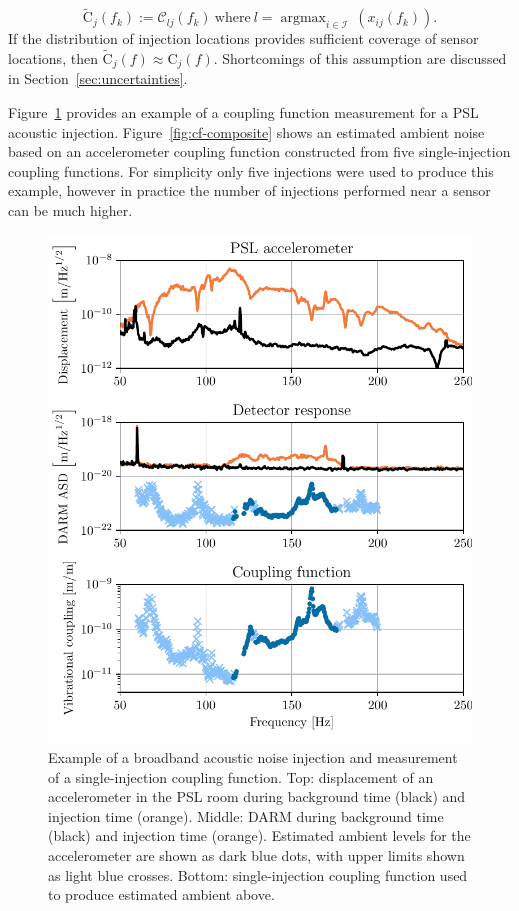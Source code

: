 \begin{equation}\label{eq:ccf}
	\widetilde{\mathrm{C}}_j(f_k) := \mathcal{C}_{lj}(f_k)\ \mathrm{where}\ l = \mathop{argmax}_{i\in\mathcal{I}}\ (x_{ij}(f_k)).
\end{equation}
If the distribution of injection locations provides sufficient coverage of sensor locations, then $\widetilde{\mathrm{C}}_j(f) \approx \mathrm{C}_j(f)$.
Shortcomings of this assumption are discussed in Section~\ref{sec:uncertainties}.

Figure~\ref{fig:cf-example} provides an example of a coupling function measurement for a \ac{PSL} acoustic injection.
Figure~\ref{fig:cf-composite} shows an estimated ambient noise based on an accelerometer coupling function constructed from five single-injection coupling functions.
For simplicity only five injections were used to produce this example, however in practice the number of injections performed near a sensor can be much higher.

\begin{figure}
	\centering
	\includegraphics[width=\textwidth]{figures/cf-example.pdf}
	\caption{
		Example of a broadband acoustic noise injection and measurement of a single-injection coupling function.
		Top: displacement of an accelerometer in the PSL room during background time (black) and injection time (orange).
		Middle: DARM during background time (black) and injection time (orange).
		Estimated ambient levels for the accelerometer are shown as dark blue dots, with upper limits shown as light blue crosses.
		Bottom: single-injection coupling function used to produce estimated ambient above.}
	\label{fig:cf-example}
\end{figure}

